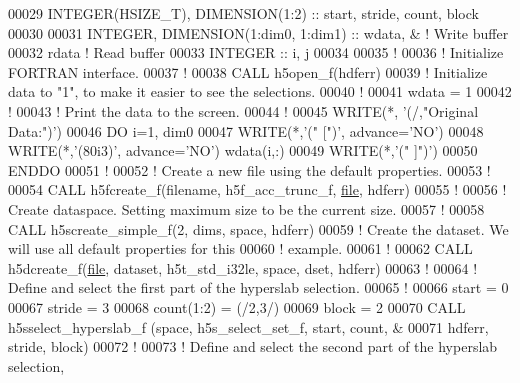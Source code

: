 \begin{DoxyCode}
00029   \textcolor{keywordtype}{INTEGER(HSIZE\_T)}, \textcolor{keywordtype}{DIMENSION(1:2)}   :: start, stride, count, block
00030 
00031   \textcolor{keywordtype}{INTEGER}, \textcolor{keywordtype}{DIMENSION(1:dim0, 1:dim1)} :: wdata, & \textcolor{comment}{! Write buffer }
00032                                         rdata    \textcolor{comment}{! Read buffer}
00033   \textcolor{keywordtype}{INTEGER} :: i, j
00034 
00035   \textcolor{comment}{!}
00036   \textcolor{comment}{! Initialize FORTRAN interface.}
00037   \textcolor{comment}{!}
00038   \textcolor{keyword}{CALL }h5open\_f(hdferr)
00039   \textcolor{comment}{! Initialize data to "1", to make it easier to see the selections.}
00040   \textcolor{comment}{!}
00041   wdata = 1
00042   \textcolor{comment}{!}
00043   \textcolor{comment}{! Print the data to the screen.}
00044   \textcolor{comment}{!}
00045   \textcolor{keyword}{WRITE}(*, \textcolor{stringliteral}{'(/,"Original Data:")'})
00046   \textcolor{keywordflow}{DO} i=1, dim0
00047      \textcolor{keyword}{WRITE}(*,\textcolor{stringliteral}{'(" [")'}, advance=\textcolor{stringliteral}{'NO'})
00048      \textcolor{keyword}{WRITE}(*,\textcolor{stringliteral}{'(80i3)'}, advance=\textcolor{stringliteral}{'NO'}) wdata(i,:)
00049      \textcolor{keyword}{WRITE}(*,\textcolor{stringliteral}{'(" ]")'})
00050 \textcolor{keywordflow}{  ENDDO}
00051   \textcolor{comment}{!}
00052   \textcolor{comment}{! Create a new file using the default properties.}
00053   \textcolor{comment}{!}
00054   \textcolor{keyword}{CALL }h5fcreate\_f(filename, h5f\_acc\_trunc\_f, \hyperlink{structfile}{file}, hdferr)
00055   \textcolor{comment}{!}
00056   \textcolor{comment}{! Create dataspace.  Setting maximum size to be the current size.}
00057   \textcolor{comment}{!}
00058   \textcolor{keyword}{CALL }h5screate\_simple\_f(2, dims, space, hdferr)
00059   \textcolor{comment}{! Create the dataset.  We will use all default properties for this}
00060   \textcolor{comment}{! example.}
00061   \textcolor{comment}{!}
00062   \textcolor{keyword}{CALL }h5dcreate\_f(\hyperlink{structfile}{file}, dataset, h5t\_std\_i32le, space, dset, hdferr)
00063   \textcolor{comment}{!}
00064   \textcolor{comment}{! Define and select the first part of the hyperslab selection.}
00065   \textcolor{comment}{!  }
00066   start = 0
00067   stride = 3
00068   count(1:2) = (/2,3/)
00069   block = 2
00070   \textcolor{keyword}{CALL }h5sselect\_hyperslab\_f (space, h5s\_select\_set\_f, start, count, &
00071        hdferr, stride, block)
00072   \textcolor{comment}{!}
00073   \textcolor{comment}{! Define and select the second part of the hyperslab selection,}

\end{DoxyCode}
